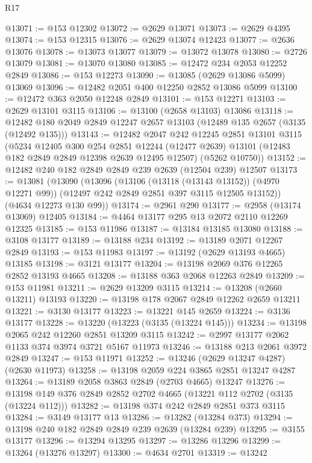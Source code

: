 \begin{lexlean}{R17}
\begin{coremodule}
@13071 := @153 @12302
@13072 := @2629 @13071
@13073 := @2629 @4395
@13074 := @153 @12315
@13076 := @2629 @13074 @12423
@13077 := @2636 @13076
@13078 := @13073 @13077
@13079 := @13072 @13078
@13080 := @2726 @13079
@13081 := @13070 @13080
@13085 := @12472 @234 @2053 @12252 @2849
@13086 := @153 @12273
@13090 := @13085 (@2629 @13086 @5099) @13069
@13096 := @12482 @2051 @400 @12250 @2852 @13086 @5099
@13100 := @12472 @363 @2050 @12248 @2849
@13101 := @153 @12271
@13103 := @2629 @13101 @3115
@13106 := @13100 (@2658 @13103) @13086
@13118 := @12482 @180 @2049 @2849 @12247 @2657 @13103 (@12489 @135 @2657 (@3135 (@12492 @135)))
@13143 := @12482
    @2047
    @242
    @12245
    @2851
    @13101
    @3115
    (@5234
      @12405
      @300
      @254
      @2851
      @12244
      (@12477 @2639)
      @13101
      (@12483 @182 @2849 @2849 @12398 @2639 @12495 @12507)
      (@5262 @10750))
@13152 := @12482 @240 @182 @2849 @2849 @239 @2639 (@12504 @239) @12507
@13173 := @13081
    (@13090
      (@13096
        (@13106 (@13118 (@13143 @13152)) (@4970 @12271 @99))
        (@12497 @242 @2849 @2851 @397 @3115 @12505 @13152))
      (@4634 @12273 @130 @99))
@13174 := @2961 @290
@13177 := @2958 (@13174 @13069) @12405
@13184 := @4464 @13177 @295 @13 @2072 @2110 @12269 @12325
@13185 := @153 @11986
@13187 := @13184 @13185 @13080
@13188 := @3108 @13177
@13189 := @13188 @234
@13192 := @13189 @2071 @12267 @2849
@13193 := @153 @11983
@13197 := @13192 (@2629 @13193 @4665) @13185
@13198 := @3121 @13177
@13204 := @13198 @2069 @376 @12265 @2852 @13193 @4665
@13208 := @13188 @363 @2068 @12263 @2849
@13209 := @153 @11981
@13211 := @2629 @13209 @3115
@13214 := @13208 (@2660 @13211) @13193
@13220 := @13198 @178 @2067 @2849 @12262 @2659 @13211
@13221 := @3130 @13177
@13223 := @13221 @145 @2659
@13224 := @3136 @13177
@13228 := @13220 (@13223 (@3135 (@13224 @145)))
@13234 := @13198 @2065 @242 @12260 @2851 @13209 @3115
@13242 := @2997 @13177 @2062 @1133 @374 @3974 @3721 @5167 @11973
@13246 := @13188 @213 @2061 @3972 @2849
@13247 := @153 @11971
@13252 := @13246 (@2629 @13247 @4287) (@2630 @11973)
@13258 := @13198 @2059 @224 @3865 @2851 @13247 @4287
@13264 := @13189 @2058 @3863 @2849 (@2703 @4665) @13247
@13276 := @13198 @149 @376 @2849 @2852 @2702 @4665 (@13221 @112 @2702 (@3135 (@13224 @112)))
@13282 := @13198 @374 @242 @2849 @2851 @373 @3115
@13284 := @3149 @13177 @13
@13286 := @13282 (@13284 @373)
@13294 := @13198 @240 @182 @2849 @2849 @239 @2639 (@13284 @239)
@13295 := @3155 @13177
@13296 := @13294 @13295
@13297 := @13286 @13296
@13299 := @13264 (@13276 @13297)
@13300 := @4634 @2701
@13319 := @13242

\end{coremodule}
\end{lexlean}
